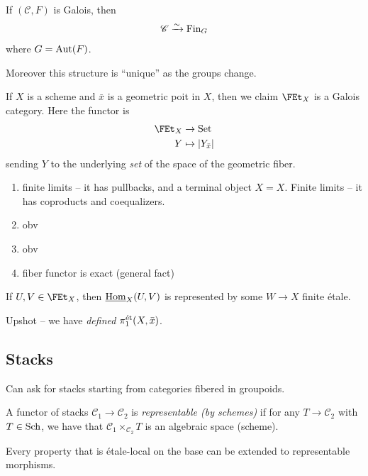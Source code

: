\documentclass[11pt]{amsart}
\begin{document}
\begin{theorem} If $(\mathscr{C},F)$ is Galois, then
\begin{align*}
    \mathscr{C} \xrightarrow{\sim} \mathrm{Fin}_G
\end{align*}
where $G = \mathrm{Aut}(F)$.
\end{theorem}
Moreover this structure is ``unique'' as the groups change.

\begin{example} If $X$ is a scheme and $\bar{x}$ is a geometric poit in $X$, then we claim $\FEt_X$ is a Galois category. Here the functor is
\begin{align*}
    \FEt_X &\to \Set \\
    Y &\mapsto \left| Y_{\bar{x}} \right|
\end{align*}
sending $Y$ to the underlying \textit{set} of the space of the geometric fiber.
\begin{enumerate}
    \item finite limits -- it has pullbacks, and a terminal object $X = X$. Finite limits -- it has coproducts and coequalizers.
    \item obv
    \item obv
    \item fiber functor is exact (general fact)
\end{enumerate}
\end{example}

\begin{lemma} If $U,V\in \FEt_X$, then $\underline{\mathrm{Hom}}_X(U,V)$ is represented by some $W \to X$ finite \'etale.
\end{lemma}

Upshot -- we have \textit{defined} $\pi_1^{\text{\'{e}t}}(X,\bar{x})$.

\subsection{Stacks}

Can ask for stacks starting from categories fibered in groupoids.

\begin{definition} A functor of stacks $\mathscr{C}_1 \to \mathscr{C}_2$ is \emph{representable (by schemes)} if for any $T \to \mathscr{C}_2$ with $T\in \mathrm{Sch}$, we have that $\mathscr{C}_1 \times_{\mathscr{C}_2}T$ is an algebraic space (scheme).
\end{definition}

\begin{remark} Every property that is \'etale-local on the base can be extended to representable morphisms.
\end{remark}
\end{document}
